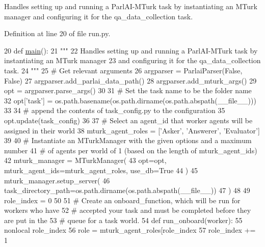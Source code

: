 \begin{DoxyVerb}Handles setting up and running a ParlAI-MTurk task by instantiating an MTurk manager
and configuring it for the qa_data_collection task.
\end{DoxyVerb}
 

Definition at line 20 of file run.\+py.


\begin{DoxyCode}
20 \textcolor{keyword}{def }\hyperlink{namespaceprojects_1_1wizard__of__wikipedia_1_1mturk__evaluation__task_1_1run_ad3ab2c71f8083c3112815c0b363d316b}{main}():
21     \textcolor{stringliteral}{"""}
22 \textcolor{stringliteral}{    Handles setting up and running a ParlAI-MTurk task by instantiating an MTurk manager}
23 \textcolor{stringliteral}{    and configuring it for the qa\_data\_collection task.}
24 \textcolor{stringliteral}{    """}
25     \textcolor{comment}{# Get relevant arguments}
26     argparser = ParlaiParser(\textcolor{keyword}{False}, \textcolor{keyword}{False})
27     argparser.add\_parlai\_data\_path()
28     argparser.add\_mturk\_args()
29     opt = argparser.parse\_args()
30 
31     \textcolor{comment}{# Set the task name to be the folder name}
32     opt[\textcolor{stringliteral}{'task'}] = os.path.basename(os.path.dirname(os.path.abspath(\_\_file\_\_)))
33 
34     \textcolor{comment}{# append the contents of task\_config.py to the configuration}
35     opt.update(task\_config)
36 
37     \textcolor{comment}{# Select an agent\_id that worker agents will be assigned in their world}
38     mturk\_agent\_roles = [\textcolor{stringliteral}{'Asker'}, \textcolor{stringliteral}{'Answerer'}, \textcolor{stringliteral}{'Evaluator'}]
39 
40     \textcolor{comment}{# Instantiate an MTurkManager with the given options and a maximum number}
41     \textcolor{comment}{# of agents per world of 1 (based on the length of mturk\_agent\_ids)}
42     mturk\_manager = MTurkManager(
43         opt=opt, mturk\_agent\_ids=mturk\_agent\_roles, use\_db=\textcolor{keyword}{True}
44     )
45     mturk\_manager.setup\_server(
46         task\_directory\_path=os.path.dirname(os.path.abspath(\_\_file\_\_))
47     )
48 
49     role\_index = 0
50 
51     \textcolor{comment}{# Create an onboard\_function, which will be run for workers who have}
52     \textcolor{comment}{# accepted your task and must be completed before they are put in the}
53     \textcolor{comment}{# queue for a task world.}
54     \textcolor{keyword}{def }run\_onboard(worker):
55         nonlocal role\_index
56         role = mturk\_agent\_roles[role\_index %
57         role\_index += 1

\end{DoxyCode}
